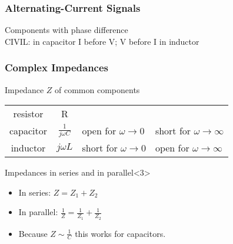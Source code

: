 \documentclass[beamer]{standalone}
\begin{document}
\begin{frame}
 \frametitle{Alternating-Current Signals}
 \begin{block}{Components with phase difference}
   \\
  CIVIL: in capacitor I before V; V before I in inductor
 \end{block}
\end{frame}


\begin{frame}[t]
 \frametitle{Complex Impedances}
 \begin{block}{Impedance $Z$ of common components}
  \begin{center}
   \begin{tabular}{c|c|l|l}
    resistor & R & \\
    capacitor & $\frac{1}{j\omega C}$ & open for $\omega \to 0$ & short for $\omega \to \infty$ \\
    inductor & $j\omega L$ & short for $\omega \to 0$ & open for $\omega \to \infty$ \\
   \end{tabular}
  \end{center}
 \end{block}
 \begin{block}{Impedances in series and in parallel}<3>
  \begin{itemize}
   \item In series: $Z = Z_1 + Z_2$
   \item In parallel: $\frac{1}{Z} = \frac{1}{Z_1} + \frac{1}{Z_2}$
   \item Because $Z \sim \frac{1}{C}$ this works for capacitors.
  \end{itemize}
 \end{block}
\end{frame}
\end{document}
